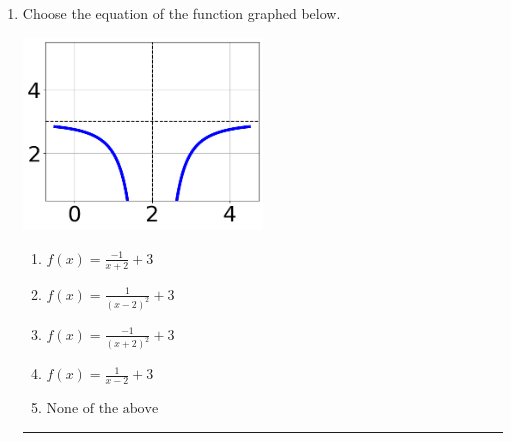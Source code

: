 \documentclass[14pt]{extbook}
\newcommand{\litem}[1]{\item#1\hspace*{-1cm}\rule{\textwidth}{0.4pt}}
\begin{document}
\begin{enumerate}
{\begin{enumerate}[label=\Alph*.]
\end{enumerate} }
\litem{
Choose the equation of the function graphed below.
\begin{center}
    \includegraphics[width=0.5\textwidth]{../Figures/rationalGraphToEquationCopyA.png}
\end{center}
\begin{enumerate}[label=\Alph*.]
\item \( f(x) = \frac{-1}{x + 2} + 3 \)
\item \( f(x) = \frac{1}{(x - 2)^2} + 3 \)
\item \( f(x) = \frac{-1}{(x + 2)^2} + 3 \)
\item \( f(x) = \frac{1}{x - 2} + 3 \)
\item \( \text{None of the above} \)


\end{enumerate}}
\end{enumerate}
\end{document}
